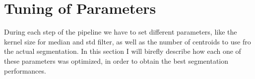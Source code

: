 \documentclass{standalone}
\begin{document}
	\section{Tuning of Parameters}
	
	During each step of the pipeline we have to set different parameters, like the kernel size for median and std filter, as well as the number of centroids to use fro the actual segmentation. In this section I will birefly describe how each one of these parameters was optimized, in order to obtain the best segmentation performances.
\end{document}

